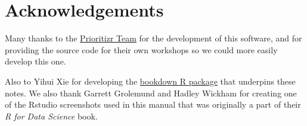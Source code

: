 \documentclass[
  12pt,
]{book}
\begin{document}
\hypertarget{acknowledgements}{%
\chapter{Acknowledgements}\label{acknowledgements}}

Many thanks to the \href{https://prioritizr.net/articles/prioritizr.html}{Prioritizr Team} for the development of this software, and for providing the source code for their own workshops so we could more easily develop this one.

Also to Yihui Xie for developing the \href{http://bookdown.org}{bookdown R package} that underpins these notes. We also thank Garrett Grolemund and Hadley Wickham for creating one of the Rstudio screenshots used in this manual that was originally a part of their \emph{R for Data Science} book.

  
\end{document}
